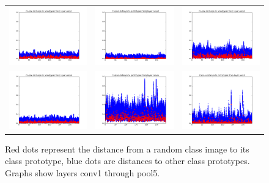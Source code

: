 \begin{figure}[htb]
\centering
\begin{tabular}{ccc}
    \includegraphics[width=0.3\linewidth]{images/classification/distances/all_classes_full_train/cos_distances_conv1}&
    \includegraphics[width=0.3\linewidth]{images/classification/distances/all_classes_full_train/cos_distances_conv2}&
    \includegraphics[width=0.3\linewidth]{images/classification/distances/all_classes_full_train/cos_distances_conv3} \\
    \includegraphics[width=0.3\linewidth]{images/classification/distances/all_classes_full_train/cos_distances_conv4}&
    \includegraphics[width=0.3\linewidth]{images/classification/distances/all_classes_full_train/cos_distances_conv5}&
    \includegraphics[width=0.3\linewidth]{images/classification/distances/all_classes_full_train/cos_distances_pool5} \\
\end{tabular}
\caption{Red dots represent the distance from a random class image to its class prototype, blue dots are distances to other class prototypes. Graphs show layers conv1 through pool5.}
\label{allclft}
\end{figure}

